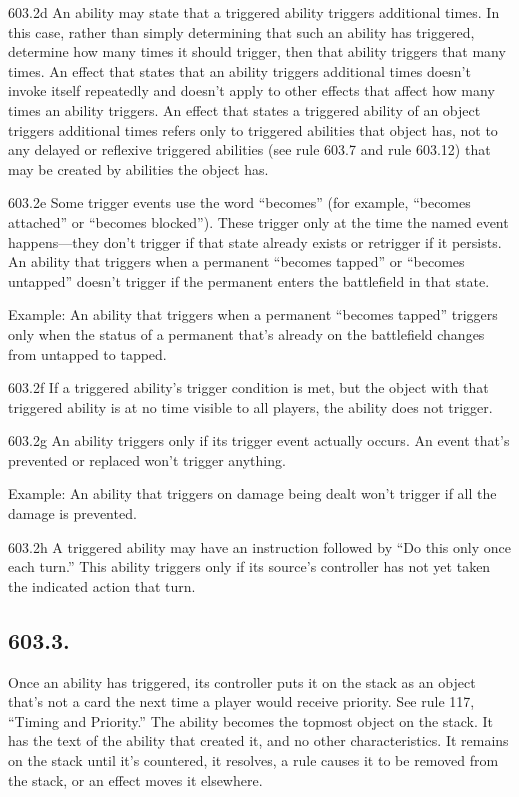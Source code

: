 603.2d An ability may state that a triggered ability triggers additional times. In this case, rather than simply determining that such an ability has triggered, determine how many times it should trigger, then that ability triggers that many times. An effect that states that an ability triggers additional times doesn’t invoke itself repeatedly and doesn’t apply to other effects that affect how many times an ability triggers. An effect that states a triggered ability of an object triggers additional times refers only to triggered abilities that object has, not to any delayed or reflexive triggered abilities (see rule 603.7 and rule 603.12) that may be created by abilities the object has.

603.2e Some trigger events use the word “becomes” (for example, “becomes attached” or “becomes blocked”). These trigger only at the time the named event happens—they don’t trigger if that state already exists or retrigger if it persists. An ability that triggers when a permanent “becomes tapped” or “becomes untapped” doesn’t trigger if the permanent enters the battlefield in that state.

Example: An ability that triggers when a permanent “becomes tapped” triggers only when the status of a permanent that’s already on the battlefield changes from untapped to tapped.

603.2f If a triggered ability’s trigger condition is met, but the object with that triggered ability is at no time visible to all players, the ability does not trigger.

603.2g An ability triggers only if its trigger event actually occurs. An event that’s prevented or replaced won’t trigger anything.

Example: An ability that triggers on damage being dealt won’t trigger if all the damage is prevented.

603.2h A triggered ability may have an instruction followed by “Do this only once each turn.” This ability triggers only if its source’s controller has not yet taken the indicated action that turn.

\subsection*{603.3.}
Once an ability has triggered, its controller puts it on the stack as an object that’s not a card the next time a player would receive priority. See rule 117, “Timing and Priority.” The ability becomes the topmost object on the stack. It has the text of the ability that created it, and no other characteristics. It remains on the stack until it’s countered, it resolves, a rule causes it to be removed from the stack, or an effect moves it elsewhere.

